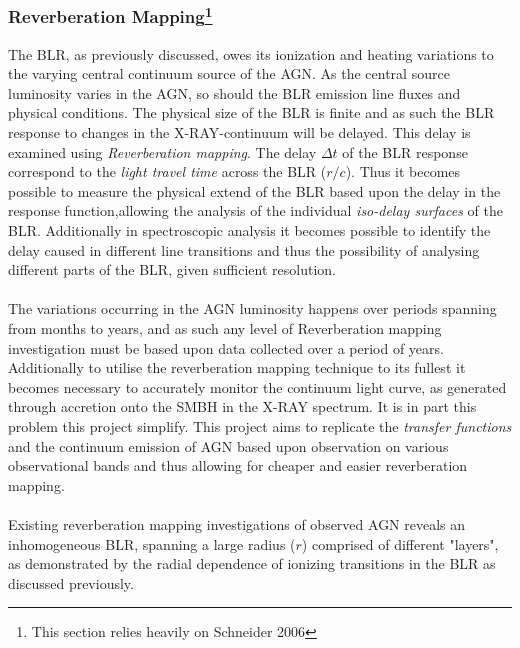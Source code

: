 \documentclass[a4paper, 12pt, twoside]{article}
\begin{document}
\subsubsection[Reverberation Mapping]{Reverberation Mapping\footnote{This section relies heavily on Schneider 2006}}
The BLR, as previously discussed, owes its ionization and heating variations to the varying central continuum source of the AGN. As the central source luminosity varies in the AGN, so should the BLR emission line fluxes and physical conditions. The physical size of the BLR is finite and as such the BLR response to changes in the X-RAY-continuum will be delayed. This delay is examined using \emph{Reverberation mapping}. The delay $\Delta t$ of the BLR response correspond to the \emph{light travel time} across the BLR ($r/c$). Thus it becomes possible to measure the physical extend of the BLR based upon the delay in the response function,allowing the analysis of the individual \emph{iso-delay surfaces} of the BLR. Additionally in spectroscopic analysis it becomes possible to identify the delay caused in different line transitions and thus the possibility of analysing different parts of the BLR, given sufficient resolution. \\
\\
The variations occurring in the AGN luminosity happens over periods spanning from months to years, and as such any level of Reverberation mapping investigation must be based upon data collected over a period of years. Additionally to utilise the reverberation mapping technique to its fullest it becomes necessary to accurately monitor the continuum light curve, as generated through accretion onto the SMBH in the X-RAY spectrum. It is in part this problem this project simplify. This project aims to replicate the \emph{transfer functions} and the continuum emission of AGN based upon observation on various observational bands and thus allowing for cheaper and easier reverberation mapping. \\
\\
Existing reverberation mapping investigations of observed AGN reveals an inhomogeneous BLR, spanning a large radius ($r$) comprised of different "layers", as demonstrated by the radial dependence of ionizing transitions in the BLR as discussed previously.
\end{document}

